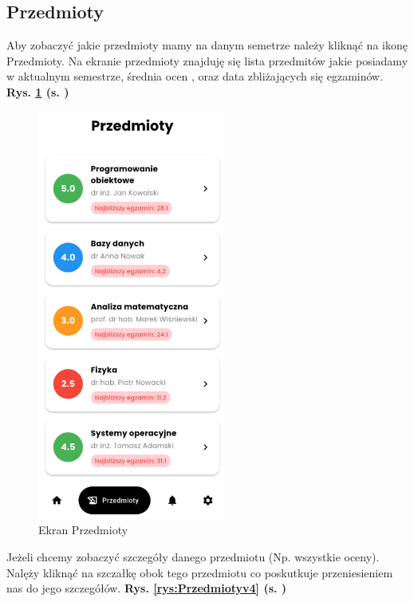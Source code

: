 \subsection{Przedmioty}
Aby zobaczyć jakie przedmioty mamy na danym semetrze należy kliknąć na ikonę Przedmioty. Na ekranie przedmioty znajduję się lista przedmitów jakie posiadamy w aktualnym semestrze, średnia ocen , oraz data zbliżających się egzaminów. \textbf{Rys. \ref{rys:Przedmiotyv3} (s. \pageref{rys:Przedmiotyv3})}
\begin{figure}[h!]
	\centering
	\includegraphics[width=0.55\textwidth]{rys/Przedmiotyv3.png}
	\caption{Ekran Przedmioty}
	\label{rys:Przedmiotyv3}
\end{figure}
\newpage
Jeżeli chcemy zobaczyć szczegóły danego przedmiotu (Np. wszystkie oceny). Nalęży kliknąć na szczałkę obok tego przedmiotu co poskutkuje przeniesieniem nas do jego szczegółów. \textbf{Rys. \ref{rys:Przedmiotyv4} (s. \pageref{rys:Przedmiotyv4})}
